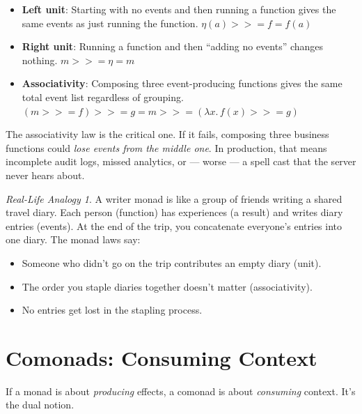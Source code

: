 \documentclass[12pt,a4paper]{article}
\theoremstyle{definition}
\theoremstyle{plain}
\theoremstyle{remark}
\newtheorem*{reallife}{Real-Life Analogy}
\begin{document}
\begin{itemize}
  \item \textbf{Left unit}: Starting with no events and then running a function
        gives the same events as just running the function.
        $\eta(a) \mathbin{>\!\!>\!\!=} f = f(a)$
  \item \textbf{Right unit}: Running a function and then ``adding no events''
        changes nothing.
        $m \mathbin{>\!\!>\!\!=} \eta = m$
  \item \textbf{Associativity}: Composing three event-producing functions
        gives the same total event list regardless of grouping.
        $(m \mathbin{>\!\!>\!\!=} f) \mathbin{>\!\!>\!\!=} g = m \mathbin{>\!\!>\!\!=} (\lambda x.\, f(x) \mathbin{>\!\!>\!\!=} g)$
\end{itemize}

The associativity law is the critical one. If it fails, composing three
business functions could \emph{lose events from the middle one}.
In production, that means incomplete audit logs, missed analytics, or
--- worse --- a spell cast that the server never hears about.

\begin{reallife}
A writer monad is like a group of friends writing a shared travel diary.
Each person (function) has experiences (a result) and writes diary entries
(events). At the end of the trip, you concatenate everyone's entries
into one diary. The monad laws say:
\begin{itemize}
  \item Someone who didn't go on the trip contributes an empty diary (unit).
  \item The order you staple diaries together doesn't matter (associativity).
  \item No entries get lost in the stapling process.
\end{itemize}
\end{reallife}


\section{Comonads: Consuming Context}
\label{sec:comonads}

If a monad is about \emph{producing} effects, a comonad is about
\emph{consuming} context. It's the dual notion.
\end{document}
